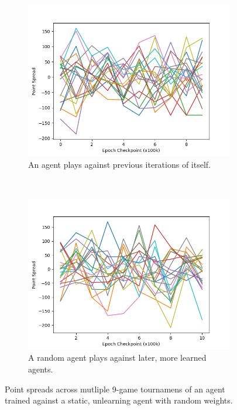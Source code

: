 \begin{figure}
\center

\begin{subfigure}[b]{0.45\textwidth}
	\includegraphics[width=\linewidth]{images/findings/round2/spreads_self-v-prev_random.png}
	\caption{An agent plays against previous iterations of itself.}
	\label{fig:r2-spreads-random-a}
\end{subfigure}
~
\begin{subfigure}[b]{0.45\textwidth}
	\includegraphics[width=\linewidth]{images/findings/round2/spreads_rand-v-fut_random.png}
	\caption{A random agent plays against later, more learned agents.}
	\label{fig:r2-spreads-random-b}
\end{subfigure}


\caption{
	Point spreads across mutliple 9-game tournamens of an agent
	trained against a static, unlearning agent with random weights.
}
\label{fig:r2-spreads-random}
\end{figure}
